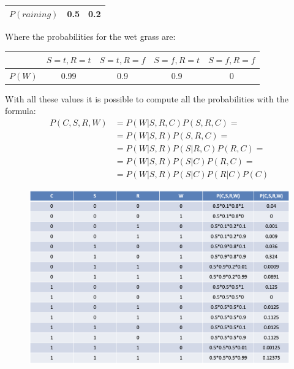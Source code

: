 \documentclass[12pt, a4paper]{report}
\newtheorem[style=M,bodystyle=\normalfont]{theorem}{Theorem}
\newtheorem[style=M,bodystyle=\normalfont]{corollary}{Corollary}
\newtheorem[style=M,bodystyle=\normalfont]{lemma}{Lemma}
\newtheorem[style=M,bodystyle=\normalfont]{definition}{Definition}
\begin{document}
\begin{example}
\begin{table}[H]
\begin{tabular}{c|cc|}
            \multicolumn{1}{|c|}{$P(raining)$} & 0.5         & 0.2          \\ \hline
            \end{tabular}
        \end{table}
        Where the probabilities for the wet grass are: 
        \begin{table}[H]
            \centering
            \begin{tabular}{c|cccc|}
            \cline{2-5}
                                         & $S=t,R=t$ & $S=t,R=f$ & $S=f,R=t$ & $S=f,R=f$ \\ \hline
            \multicolumn{1}{|c|}{$P(W)$} & 0.99                      & 0.9                        & 0.9                       & 0                                 \\ \hline
            \end{tabular}
        \end{table}
        With all these values it is possible to compute all the probabilities with the formula: 
        \[
        \begin{aligned}
            P(C,S,R,W)  &= P(W|S,R,C)P(S,R,C)=      \\
                        &= P(W|S,R)P(S,R,C)=        \\
                        &= P(W|S,R)P(S|R,C)P(R,C)=  \\
                        &= P(W|S,R)P(S|C)P(R,C)=    \\
                        &= P(W|S,R)P(S|C)P(R|C)P(C)
        \end{aligned}
        \]
        \begin{figure}[H]
            \centering
            \includegraphics[width=0.9\linewidth]{images/probabilities.png}
        \end{figure}
    \end{example}
\end{document}
